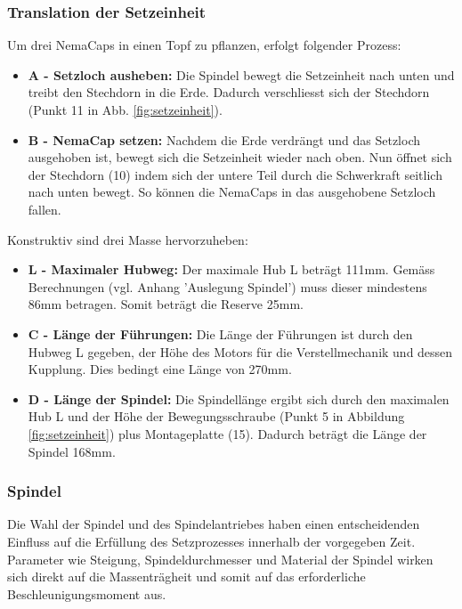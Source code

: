  
\subsubsection{Translation der Setzeinheit}
Um drei NemaCaps in einen Topf zu pflanzen, erfolgt folgender Prozess:
\begin{itemize}
	\item \textbf{A - Setzloch ausheben:} Die Spindel bewegt die Setzeinheit nach unten und treibt den Stechdorn in die Erde. Dadurch verschliesst sich der Stechdorn (Punkt 11 in Abb. \ref{fig:setzeinheit}). 

	\item \textbf{B - NemaCap setzen:} Nachdem die Erde verdrängt und das Setzloch ausgehoben ist, bewegt sich die Setzeinheit wieder nach oben. Nun öffnet sich der Stechdorn (10) indem sich der untere Teil durch die Schwerkraft seitlich nach unten bewegt. So können die NemaCaps in das ausgehobene Setzloch fallen.
\end{itemize}
\newpage
Konstruktiv sind drei Masse hervorzuheben:
\begin{itemize}
	\item \textbf{L - Maximaler Hubweg:} Der maximale Hub L beträgt 111mm. Gemäss Berechnungen (vgl. Anhang 'Auslegung Spindel') muss dieser mindestens 86mm betragen. Somit beträgt die Reserve 25mm. 
	
	\item \textbf{C - Länge der Führungen:} Die Länge der Führungen ist durch den Hubweg L gegeben, der Höhe des Motors für die Verstellmechanik  und dessen Kupplung. Dies bedingt eine Länge von 270mm.
	
	\item \textbf{D - Länge der Spindel:} Die Spindellänge ergibt sich durch den maximalen Hub L und der Höhe der Bewegungsschraube (Punkt 5 in Abbildung \ref{fig:setzeinheit}) plus Montageplatte (15). Dadurch beträgt die Länge der Spindel 168mm.
\end{itemize}

\subsubsection{Spindel} \label{sec:Umsetzung_Spindel}
Die Wahl der Spindel und des Spindelantriebes haben einen entscheidenden Einfluss auf die Erfüllung des Setzprozesses innerhalb der vorgegeben Zeit. Parameter wie Steigung, Spindeldurchmesser und Material der Spindel wirken sich direkt auf die Massenträgheit und somit auf das erforderliche Beschleunigungsmoment aus.
\newline

